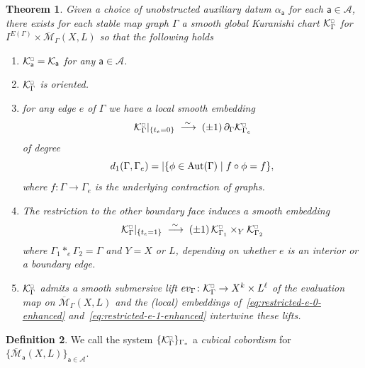 \documentclass[11pt,psamsfonts, oneside, reqno]{amsart}
\newcommand{\g}{\circ}%
\newcommand{\cl}{\colon}
\newcommand{\eva}{ev}
\newcommand{\Mbar}{\overline{\mathcal M}}
\newcommand{\del}{\partial}
\newcommand{\Aut}{\normalfont\text{Aut}}
\newcommand{\cA}{\mathcal{A}}
\newcommand{\cK}{\mathcal{K}}
\newcommand{\cKc}{\cK^{\scale{\square}{0.6}}}
\newcommand{\scale}[2]{\scaleobj{#2}{#1}}
\newtheorem{theorem}{Theorem}[section]
\theoremstyle{definition}
\newtheorem{definition}[theorem]{Definition}
\theoremstyle{remark}
\numberwithin{equation}{section}
\begin{document}
\begin{theorem}\label{thm:cubical-cobordisms-enhanced} 
	Given a choice of unobstructed auxiliary datum $\alpha_{\mathsf{a}}$ for each $\mathsf{a}\in \cA$, there exists for each stable map graph $\Gamma$ a \emph{smooth} global Kuranishi chart ${\cKc_\Gamma}$ for $I^{E(\Gamma)}\times\Mbar_{\Gamma}(X,L)$ so that the following holds
		\begin{enumerate}[label=\arabic*),leftmargin=20pt,ref=\arabic*]
		\item ${\cKc_{\mathsf{a}}} =\cK_{\mathsf{a}}$ for any $\mathsf{a} \in \cA$.
		\item ${\cKc_\Gamma}$ is oriented.
		\item\label{cubical-1-boundary-enhanced} for any edge $e$ of $\Gamma$ we have a local smooth embedding
		\begin{equation}\label{eq:restricted-e-0-enhanced} 
			{\cKc_{\Gamma}}|_{\{t_e = 0\}} \;\stackrel{\sim\,}{\longrightarrow}\; (\pm 1)\,\del_\Gamma{\cKc_{\Gamma_e}}
		\end{equation}
	of degree \[d_1(\Gamma,\Gamma_e) = |\{\phi\in \Aut(\Gamma)\mid f\g\phi = f\},\] where $f\cl \Gamma\to \Gamma_e$ is the underlying contraction of graphs.
	\item\label{cubical-0-boundary-enhanced} The restriction to the other boundary face induces a smooth embedding
	\begin{equation}\label{eq:restricted-e-1-enhanced} {\cKc_{\Gamma}}|_{\{t_e = 1\}} \;\stackrel{\sim\,}{\longrightarrow}\; (\pm 1)\,{\cKc_{\Gamma_1}}\times_{Y}{\cKc_{\Gamma_2}}
	\end{equation}
	where $\Gamma_1*_e \Gamma_2 = \Gamma$ and $Y = X$ or $L$, depending on whether $e$ is an interior or a boundary edge.
	\item\label{evaluation-cubical} ${\cKc_\Gamma}$ admits a smooth submersive lift $\eva_\Gamma\cl {\cKc_\Gamma}\to X^k\times L^\ell$ of the evaluation map on $\Mbar_\Gamma(X,L)$ and the (local) embeddings of~\eqref{eq:restricted-e-0-enhanced} and~\eqref{eq:restricted-e-1-enhanced} intertwine these lifts.
	\end{enumerate}
\end{theorem}



\begin{definition}\label{de:cubical-cobordism} We call the system $\{\cKc_{\Gamma}\}_{\Gamma_*}$ a \emph{cubical cobordism} for $\{\Mbar_{\mathsf{a}}(X,L)\}_{\mathsf{a}\in \cA}$.
\end{definition}
\end{document}
